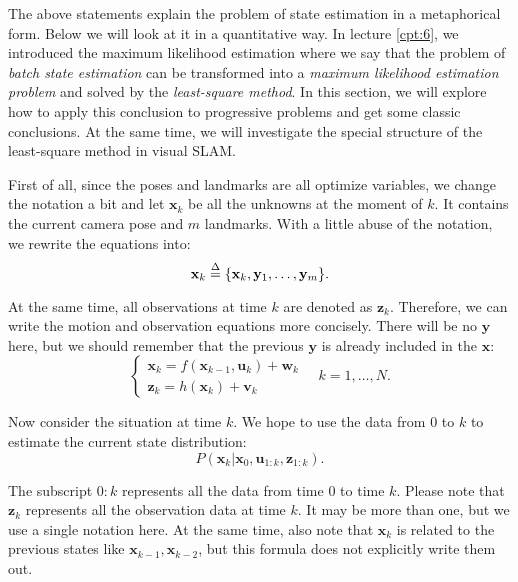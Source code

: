 The above statements explain the problem of state estimation in a metaphorical form. Below we will look at it in a quantitative way. In lecture \ref{cpt:6}, we introduced the maximum likelihood estimation where we say that the problem of \textit{batch state estimation} can be transformed into a \textit{maximum likelihood estimation problem} and solved by the \textit{least-square method}. In this section, we will explore how to apply this conclusion to progressive problems and get some classic conclusions. At the same time, we will investigate the special structure of the least-square method in visual SLAM.

First of all, since the poses and landmarks are all optimize variables, we change the notation a bit and let $\mathbf{x}_k$ be all the unknowns at the moment of $k$. It contains the current camera pose and $m$ landmarks. With a little abuse of the notation, we rewrite the equations into:
\begin{equation}
	\mathbf{x}_k  \buildrel \Delta \over =  \{ \mathbf{x}_k, \mathbf{y}_1, \ldots, \mathbf{y}_m \}.
\end{equation}

At the same time, all observations at time $k$ are denoted as $\mathbf{z}_k$. Therefore, we can write the motion and observation equations more concisely. There will be no $\mathbf{y}$ here, but we should remember that the previous $\mathbf{y}$ is already included in the $\mathbf{x}$:
\begin{equation}
	\left\{ \begin{array}{l}
		{\mathbf{x}_k} = f\left( {{\mathbf{x}_{k - 1}},{\mathbf{u}_k}} \right) + \mathbf{w}_k \\
		{\mathbf{z}_{k}} = h\left( \mathbf{x}_k  \right)+ \mathbf{v}_{k}
	\end{array} \right. \quad k=1, \ldots, N .
\end{equation}

Now consider the situation at time $k$. We hope to use the data from $0$ to $k$ to estimate the current state distribution:
\begin{equation}
	P(\mathbf{x}_k | \mathbf{x}_0, \mathbf{u}_{1:k}, \mathbf{z}_{1:k}).
\end{equation}

The subscript $0:k$ represents all the data from time $0$ to time $k$. Please note that $\mathbf{z}_k$ represents all the observation data at time $k$. It may be more than one, but we use a single notation here. At the same time, also note that $\mathbf{x}_k$ is related to the previous states like $\mathbf{x}_{k-1}, \mathbf{x}_{k-2}$, but this formula does not explicitly write them out.

